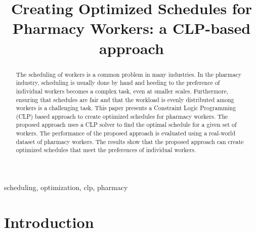 \documentclass[conference]{IEEEtran}
\begin{document}
\title{
    Creating Optimized Schedules for Pharmacy Workers: a CLP-based approach \\
}

\author{
\and
}

\maketitle

\begin{abstract}

The scheduling of workers is a common problem in many industries.
In the pharmacy industry, scheduling is usually done by hand and heeding to the preference of individual workers becomes a complex task, even at smaller scales. Furthermore, ensuring that schedules are fair and that the workload is evenly distributed among workers is a challenging task.
This paper presents a Constraint Logic Programming (CLP) based approach to create optimized schedules for pharmacy workers. The proposed approach uses a CLP solver to find the optimal schedule for a given set of workers. The performance of the proposed approach is evaluated using a real-world dataset of pharmacy workers. The results show that the proposed approach can create optimized schedules that meet the preferences of individual workers.

\end{abstract}

\begin{IEEEkeywords}
scheduling, optimization, clp, pharmacy
\end{IEEEkeywords}

\section{Introduction}
\end{document}
